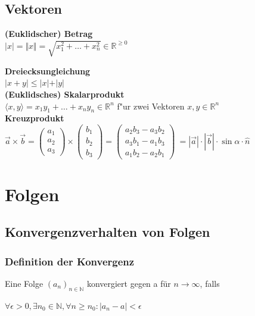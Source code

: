 \documentclass[8pt, a4paper, landscape, fleqn]{scrartcl}
\def\N{\mathbb{N}}
\begin{document}
\begin{multicols*}{3}
				\subsection{Vektoren}
					\textbf{(Euklidscher) Betrag}\\
					$ \vert x \vert = \Vert x \Vert = \sqrt{x_1^2 + \dots + x_n^2} \in \mathbb{R}^{\geqslant 0} $
					
					\textbf{Dreiecksungleichung}\\
					$ \vert x+y \vert \leqslant \vert x \vert + \vert y \vert $\\
					\textbf{(Euklidsches) Skalarprodukt}\\
					$ \langle x,y \rangle =  x_1 y_1 + \dots + x_n y_n \in \mathbb{R}^{n} $ f"ur zwei Vektoren $ x,y \in \mathbb{R}^{n} $\\
					\textbf{Kreuzprodukt}\\
					$   \vec{a}\times\vec{b}
  					=
  					\begin{pmatrix}a_1 \\ a_2 \\ a_3\end{pmatrix}
  					\times
  					\begin{pmatrix}b_1 \\ b_2 \\ b_3 \end{pmatrix}
  					=
  					\begin{pmatrix}
    					a_2b_3 - a_3b_2 \\
    					a_3b_1 - a_1b_3 \\
   					a_1b_2 - a_2b_1
  					\end{pmatrix}\ = |\vec{a}|\cdot|\vec{b}|\cdot \sin \alpha \cdot\hat{n}$ 
			
		\section{Folgen}
			\subsection{Konvergenzverhalten von Folgen}
		    	\subsubsection{Definition der Konvergenz}
			    Eine Folge $(a_n)_{n \in \N}$ konvergiert gegen a für $n \to \infty$, falls
			    
			    $\forall \epsilon > 0, \exists n_0 \in \N, \forall n \geq n_0: |a_n - a| < \epsilon$
			    

\end{multicols*}
\end{document}
